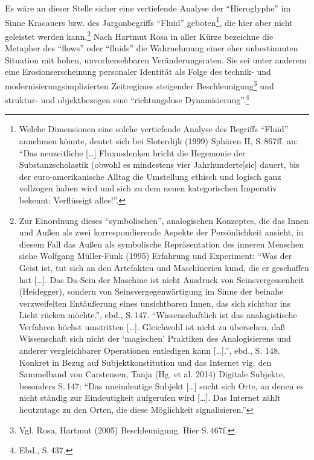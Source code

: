 \documentclass[a4paper,
fontsize=11pt,
oneside,
numbers=noperiodatend,
parskip=half-,
bibliography=totoc,
final
]{scrartcl}
\begin{document}
Es wäre an dieser Stelle sicher eine vertiefende Analyse der
\enquote{Hieroglyphe} im Sinne Kracauers bzw. des Jargonbegriffs
\enquote{Fluid} geboten\footnote{Welche Dimensionen eine solche
  vertiefende Analyse des Begriffs \enquote{Fluid} annehmen könnte,
  deutet sich bei Sloterdijk (1999) Sphären II, S.\,867ff. an:
  \enquote{Das neuzeitliche {[}\ldots{}{]} Fluxusdenken bricht die
  Hegemonie der Substanzscholastik (obwohl es mindestens vier
  Jahrhunderte{[}sic{]} dauert, bis der euro-amerikanische Alltag die
  Umstellung ethisch und logisch ganz vollzogen haben wird und sich zu
  dem neuen kategorischen Imperativ bekennt: Verflüssigt alles!}.}, die
hier aber nicht geleistet werden kann.\footnote{Zur Einordnung dieses
  \enquote{symbolischen}, analogischen Konzeptes, die das Innen und
  Außen als zwei korrespondierende Aspekte der Persönlichkeit ansieht,
  in diesem Fall das Außen als symbolische Repräsentation des inneren
  Menschen siehe Wolfgang Müller-Funk (1995) Erfahrung und Experiment:
  \enquote{Was der Geist ist, tut sich an den Artefakten und
  Maschinerien kund, die er geschaffen hat {[}\ldots{}{]}. Das Da-Sein
  der Maschine ist nicht Ausdruck von Seinsvergessenheit (Heidegger),
  sondern von Seinsvergegenwärtigung im Sinne der beinahe verzweifelten
  Entäußerung eines unsichtbaren Innen, das sich sichtbar ins Licht
  rücken möchte.}, ebd., S.\,147. \enquote{Wissenschaftlich ist das
  analogistische Verfahren höchst umstritten {[}\ldots{}{]}. Gleichwohl
  ist nicht zu übersehen, daß Wissenschaft sich nicht der
  \enquote{magischen} Praktiken des Analogisierens und anderer
  vergleichbarer Operationen entledigen kann {[}\ldots{}{]}.}, ebd., S.
  148. Konkret in Bezug auf Subjektkonstitution und das Internet vlg.
  den Sammelband von Carstensen, Tanja (Hg. et al. 2014) Digitale
  Subjekte, besonders S.\,147: \enquote{Das uneindeutige Subjekt
  {[}\ldots{}{]} sucht sich Orte, an denen es nicht ständig zur
  Eindeutigkeit aufgerufen wird {[}\ldots{}{]}. Das Internet zählt
  heutzutage zu den Orten, die diese Möglichkeit signalisieren.}} Nach
Hartmut Rosa in aller Kürze bezeichne die Metapher des \enquote{flows}
oder \enquote{fluids} die Wahrnehmung einer eher unbestimmten Situation
mit hohen, unvorhersehbaren Veränderungsraten. Sie sei unter anderem
eine Erosionserscheinung personaler Identität als Folge des technik- und
modernisierungsimplizierten Zeitregimes steigender
Beschleunigung\footnote{Vgl. Rosa, Hartmut (2005) Beschleunigung. Hier
  S.\,467f.} und struktur- und objektbezogen eine \enquote{richtungslose
Dynamisierung}.\footnote{Ebd., S.\,437.}
\end{document}
